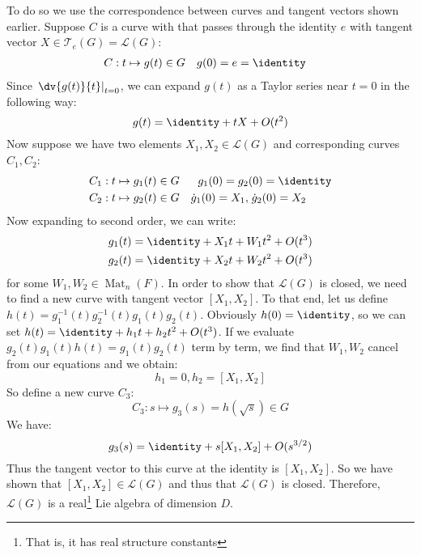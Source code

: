 \documentclass{jknotes}
\begin{document}
To do so we use the correspondence between curves and tangent vectors shown earlier. Suppose \(C\) is a curve with that passes through the identity \(e\) with tangent vector \(X \in \mathcal{T}_e(G)=\mathcal{L}(G)\):
\begin{align}
    C:t &\mapsto g(t) \in G & g(0) &=e=\identity
\end{align}
Since \(\left.\dv{g(t)}{t}\right|_{t=0}\), we can expand \(g(t)\) as a Taylor series near \(t=0\) in the following way:
\begin{equation}
    g(t) = \identity + tX + O(t^2)
\end{equation}
Now suppose we have two elements \(X_1,X_2 \in \mathcal{L}(G)\) and corresponding curves \(C_1,C_2\):
\begin{align}
    C_1:t &\mapsto g_1(t) \in G & g_1(0)=g_2&(0)=\identity\\
    C_2:t &\mapsto g_2(t) \in G & \dot{g}_1(0)=X_1,&\;\dot{g}_2(0)=X_2
\end{align}
Now expanding to second order, we can write:
\begin{align}
    g_1(t) &= \identity + X_1t + W_1t^2 + O(t^3)\\
    g_2(t) &= \identity + X_2t + W_2t^2 + O(t^3)
\end{align}
for some \(W_1,W_2 \in \operatorname{Mat}_n(F)\). In order to show that \(\mathcal{L}(G)\) is closed, we need to find a new curve with tangent vector \([X_1,X_2]\). To that end, let us define \(h(t) = g_1^{-1}(t)g_2^{-1}(t)g_1(t)g_2(t)\). Obviously \(h(0) = \identity\), so we can set \(h(t) = \identity + h_1t + h_2t^2 + O(t^3)\). If we evaluate \(g_2(t)g_1(t)h(t) = g_1(t)g_2(t)\) term by term, we find that \(W_1,W_2\) cancel from our equations and we obtain:
\begin{equation}
    h_1 = 0, h_2 = [X_1,X_2]
\end{equation}
So define a new curve \(C_3\):
\begin{equation}
    C_3 : s \mapsto g_3(s) = h(\sqrt{s}) \in G
\end{equation}
We have:
\begin{equation}
    g_3(s) = \identity + s[X_1,X_2] + O(s^{3/2})
\end{equation}
Thus the tangent vector to this curve at the identity is \([X_1,X_2]\). So we have shown that \([X_1,X_2] \in \mathcal{L}(G)\) and thus that \(\mathcal{L}(G)\) is closed. Therefore, \(\mathcal{L}(G)\) is a real\footnote{That is, it has real structure constants} Lie algebra of dimension \(D\).
\end{document}

